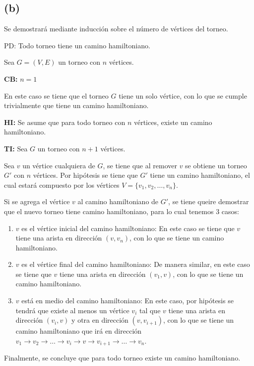 \documentclass[12pt]{article}
\newcommand{\ra}{\rightarrow}
\begin{document}
\newpage
\subsection*{(b)}

Se demostrará mediante inducción sobre el número de vértices del torneo.

PD: Todo torneo tiene un camino hamiltoniano.

Sea $G=(V,E)$ un torneo con $n$ vértices.

\textbf{CB:} $n=1$

En este caso se tiene que el torneo $G$ tiene un solo vértice, con lo que se cumple trivialmente que tiene un camino hamiltoniano.

\textbf{HI:} Se asume que para todo torneo con $n$ vértices, existe un camino hamiltoniano.

\textbf{TI:} Sea $G$ un torneo con $n+1$ vértices.

Sea $v$ un vértice cualquiera de $G$, se tiene que al remover $v$ se obtiene un torneo $G'$ con $n$ vértices.
Por hipótesis se tiene que $G'$ tiene un camino hamiltoniano, el cual estará compuesto por los vértices $V = \{v_1, v_2, \ldots, v_n\}$.

Si se agrega el vértice $v$ al camino hamiltoniano de $G'$, se tiene queire demostrar que el nuevo torneo tiene camino hamiltoniano,
para lo cual tenemos 3 casos:

\begin{enumerate}
    \item $v$ es el vértice inicial del camino hamiltoniano:
        En este caso se tiene que $v$ tiene una arista en dirección $(v, v_n)$, con lo que se tiene un camino hamiltoniano.
    
    \item $v$ es el vértice final del camino hamiltoniano:
        De manera similar, en este caso se tiene que $v$ tiene una arista en dirección $(v_1, v)$, con lo que se tiene un camino hamiltoniano.

    \item $v$ está en medio del camino hamiltoniano:
        En este caso, por hipótesis se tendrá que existe al menos un vértice $v_i$ tal que $v$ tiene una arista en dirección $(v_i, v)$ y otra en dirección $(v, v_{i+1})$,
        con lo que se tiene un camino hamiltoniano que irá en dirección
        $v_1 \ra v_2 \ra \ldots \ra v_i \ra v \ra v_{i+1} \ra \ldots \ra v_n$.
\end{enumerate}

Finalmente, se concluye que para todo torneo existe un camino hamiltoniano.
\end{document}
